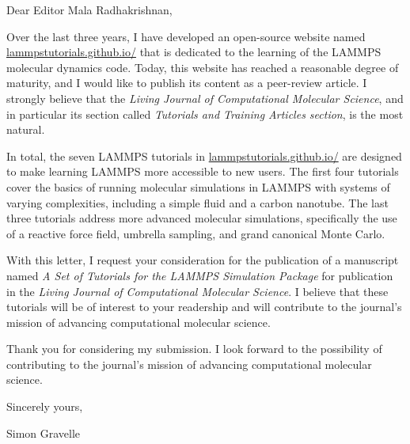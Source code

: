 \documentclass{article}
\begin{document}
\bigskip 

Dear Editor Mala Radhakrishnan,

\bigskip 

Over the last three years, I have developed an open-source website named \href{https://lammpstutorials.github.io/}{lammpstutorials.github.io/} that is dedicated to the learning of the LAMMPS molecular dynamics code. Today, this website has reached a reasonable degree of maturity, and I would like to publish its content as a peer-review article. I strongly believe that the \textit{Living Journal of Computational Molecular Science}, and in particular its section called \textit{Tutorials and Training Articles section}, is the most natural. 

In total, the seven LAMMPS tutorials in \href{https://lammpstutorials.github.io/}{lammpstutorials.github.io/} are designed to make learning LAMMPS more accessible to new users. The first four tutorials cover the basics of running molecular simulations in LAMMPS with systems of varying complexities, including a simple fluid and a carbon nanotube. The last three tutorials address more advanced molecular simulations, specifically the use of a reactive force field, umbrella sampling, and grand canonical Monte Carlo.

With this letter, I request your consideration for the publication of a manuscript named \textit{A Set of Tutorials for the LAMMPS Simulation Package} for publication in the \textit{Living Journal of Computational Molecular Science}. I believe that these tutorials will be of interest to your readership and will contribute to the journal's mission of advancing computational molecular science.

Thank you for considering my submission. I look forward to the possibility of contributing to the journal's mission of advancing computational molecular science.

\bigskip %

Sincerely yours,

\bigskip %

Simon Gravelle
\end{document}

